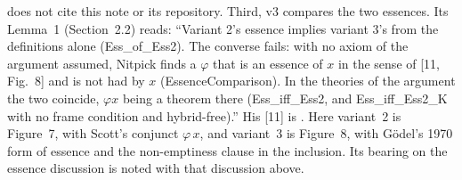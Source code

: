 \documentclass[11pt,a4paper]{article}
\theoremstyle{definition}
\theoremstyle{remark}
\begin{document}
does not cite this note or its repository.
Third, v3 compares the two essences.
Its Lemma~1 (Section~2.2) reads: ``Variant 2's essence implies variant 3's
from the definitions alone (Ess\_of\_Ess2). The converse fails: with no axiom
of the argument assumed, Nitpick finds a \(\varphi\) that is an essence of
\(x\) in the sense of [11, Fig.~8] and is not had by \(x\)
(EssenceComparison). In the theories of the argument the two coincide,
\(\varphi x\) being a theorem there (Ess\_iff\_Ess2, and Ess\_iff\_Ess2\_K
with no frame condition and hybrid-free).''
His [11] is \cite{benzmuellerScott2025}.
Here variant~2 is Figure~7, with Scott's conjunct \(\varphi\,x\), and
variant~3 is Figure~8, with G\"odel's 1970 form of essence and the
non-emptiness clause in the inclusion.
Its bearing on the essence discussion is noted with that discussion above.
\end{document}
